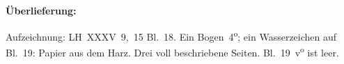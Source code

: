 %
%
%
\begin{ledgroupsized}[r]{120mm}
\footnotesize
\pstart
\noindent\textbf{Überlieferung:}
\pend
\end{ledgroupsized}
\begin{ledgroupsized}[r]{114mm}
\footnotesize
\pstart \parindent -6mm
%
Aufzeichnung: LH~XXXV~9,~15 Bl.~18.
Ein Bogen~4\textsuperscript{o};
ein Wasserzeichen auf Bl.~19: Papier aus dem Harz.
Drei voll beschriebene Seiten.
Bl.~19~v\textsuperscript{o} ist leer.
\pend
\end{ledgroupsized}
%
%
\vspace{5mm}
